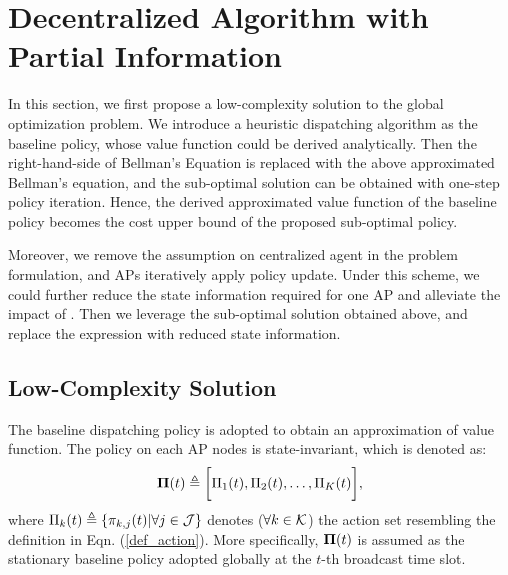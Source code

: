\section{Decentralized Algorithm with Partial Information}
In this section, we first propose a low-complexity solution to the global optimization problem.
We introduce a heuristic dispatching algorithm as the baseline policy, whose value function could be derived analytically.
Then the right-hand-side of Bellman's Equation is replaced with the above approximated Bellman's equation, and the sub-optimal solution can be obtained with one-step policy iteration.
Hence, the derived approximated value function of the baseline policy becomes the cost upper bound of the proposed sub-optimal policy.

Moreover, we remove the assumption on centralized agent in the problem formulation, and APs iteratively apply policy update.
Under this scheme, we could further reduce the state information required for one AP and alleviate the impact of \brlatency.
Then we leverage the sub-optimal solution obtained above, and replace the expression with reduced state information.

\subsection{Low-Complexity Solution}
The baseline dispatching policy is adopted to obtain an approximation of value function. The policy on each AP nodes is state-invariant, which is denoted as:
\begin{align}
    \boldsymbol{\Pi}(t) \triangleq \bigg[\Pi_1(t), \Pi_2(t), \dots, \Pi_K(t)\bigg],
\end{align}
where $\Pi_k(t) \triangleq \{\pi_{k,j}(t) | \forall j\in\mathcal{J}\}$ denotes ($\forall k\in\mathcal{K}$) the action set resembling the definition in Eqn. (\ref{def_action}).
More specifically, $\boldsymbol{\Pi}(t)$ is assumed as the stationary baseline policy adopted globally at the $t$-th broadcast time slot.

